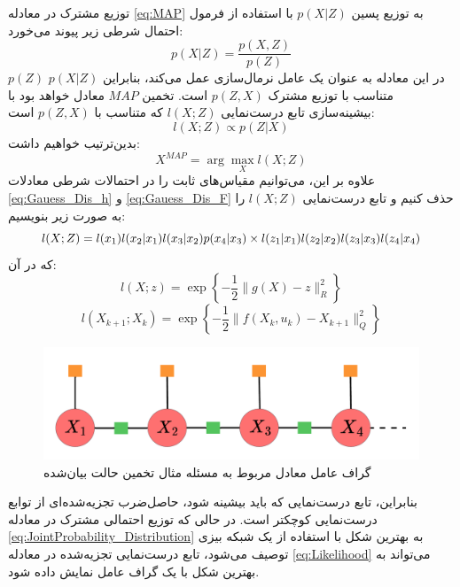  توزیع مشترک در معادله
 \ref{eq:MAP}
 به توزیع پسین \(p(X|Z)\) با استفاده از فرمول احتمال شرطی زیر پیوند می‌خورد:
\begin{equation}
	p(X|Z) = \frac{p(X, Z)}{p(Z)}
\end{equation}
\(p(Z)\) در این معادله به عنوان یک عامل نرمال‌سازی عمل می‌کند، بنابراین \(p(X|Z)\) متناسب با توزیع مشترک \(p(Z, X)\) است. تخمین $MAP$ معادل خواهد بود با بیشینه‌سازی تابع درست‌نمایی \(l(X; Z)\) که متناسب با \(p(Z, X)\) است:
\begin{equation}
	l(X; Z) \propto p(Z|X)
\end{equation}
بدین‌ترتیب خواهیم داشت:
\begin{equation}
	X^{MAP} = \arg\max_X l(X; Z)
\end{equation}
علاوه بر این، می‌توانیم مقیاس‌های ثابت را در احتمالات شرطی معادلات
\ref{eq:Gauess_Dis_h}
و
\ref{eq:Gauess_Dis_F}
حذف کنیم و تابع درست‌نمایی \(l(X; Z)\) را به صورت زیر بنویسیم:
\begin{equation} \label{eq:Likelihood}
	l(X; Z) = l(x_1) l(x_2|x_1) l(x_3|x_2) p(x_4|x_3) \\
	\times l(z_1|x_1) l(z_2|x_2) l(z_3|x_3) l(z_4|x_4)
\end{equation}
که در آن:
\begin{equation}
	l(X; z) = \exp \left\{ -\frac{1}{2} \|g(X) - z \|_R^2 \right\}
\end{equation}
\begin{equation}
	l(X_{k+1}; X_k) = \exp \left\{ -\frac{1}{2} \|f(X_k, u_k) - X_{k+1}\|_Q^2 \right\}
\end{equation}

\begin{figure} [!t]
	\centering
	\includegraphics[width=0.6\linewidth]{img/StateEstimationFGAppendinx}
	\caption{گراف عامل معادل مربوط به مسئله مثال  تخمین حالت بیان‌شده}
	\label{fig:stateestimationfgappendinx}
\end{figure}

بنابراین، تابع درست‌نمایی که باید بیشینه شود، حاصل‌ضرب تجزیه‌شده‌ای از توابع درست‌نمایی کوچکتر است. در حالی که توزیع احتمالی مشترک در معادله
\ref{eq:JointProbability_Distribution}
به بهترین شکل با استفاده از یک شبکه بیزی توصیف می‌شود، تابع درست‌نمایی تجزیه‌شده در معادله
\ref{eq:Likelihood}
می‌تواند به بهترین شکل با یک گراف عامل نمایش داده شود.


